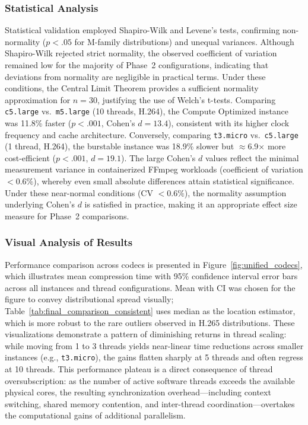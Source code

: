 \documentclass[conference]{IEEEtran}
\begin{document}
\subsubsection{Statistical Analysis}

Statistical validation employed Shapiro-Wilk and Levene's tests, confirming
non-normality ($p < .05$ for M-family distributions) and unequal variances.
Although Shapiro-Wilk rejected strict normality, the observed coefficient of
variation remained low for the majority of Phase~2 configurations, indicating
that deviations from normality are negligible in practical terms. Under these
conditions, the Central Limit Theorem provides a sufficient normality
approximation for $n=30$, justifying the use of Welch's t-tests. Comparing \texttt{c5.large}
vs.\ \texttt{m5.large} (10 threads, H.264), the Compute Optimized instance was
11.8\% faster ($p < .001$, Cohen's $d = 13.4$), consistent with its higher
clock frequency and cache architecture. Conversely, comparing \texttt{t3.micro}
vs.\ \texttt{c5.large} (1 thread, H.264), the burstable instance was 18.9\%
slower but $\approx$6.9$\times$ more cost-efficient ($p < .001$, $d = 19.1$). The large
Cohen's $d$ values reflect the minimal measurement variance in containerized
FFmpeg workloads (coefficient of variation $< 0.6\%$), whereby even small
absolute differences attain statistical significance. Under these near-normal
conditions (CV $< 0.6\%$), the normality assumption underlying Cohen's $d$ is
satisfied in practice, making it an appropriate effect size measure for
Phase~2 comparisons.

\subsubsection{Visual Analysis of Results}

Performance comparison across codecs is presented in
Figure~\ref{fig:unified_codecs}, which illustrates mean compression time with
95\% confidence interval error bars across all instances and thread
configurations. Mean with CI was chosen for the figure to convey distributional
spread visually; Table~\ref{tab:final_comparison_consistent} uses median as the
location estimator, which is more robust to the rare outliers observed in H.265
distributions. These visualizations
demonstrate a pattern of diminishing returns in thread scaling: while moving
from 1 to 3 threads yields near-linear time reductions across smaller instances
(e.g., \texttt{t3.micro}), the gains flatten sharply at 5 threads and often
regress at 10 threads. This performance plateau is a direct consequence of
thread oversubscription: as the number of active software threads exceeds the
available physical cores, the resulting synchronization overhead---including
context switching, shared memory contention, and inter-thread
coordination---overtakes the computational gains of additional parallelism.
\end{document}
